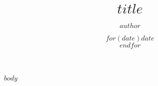 
\providecommand{\tightlist}{}

\makeatletter
\def\labelenumi{第\theenumi 章　}
\def\theenumii{\arabic{enumii}}
\def\p@enumii{}
\def\labelenumii{第\theenumii 条　}
\def\theenumiii{\arabic{enumiii}}
\def\labelenumiii{\theenumiii　}
\def\p@enumiii{}
\makeatother
\title{\Huge $title$}
\author{\huge $author$}
\date{\LARGE $for(date)$$date$\\$endfor$}

\maketitle
$body$

